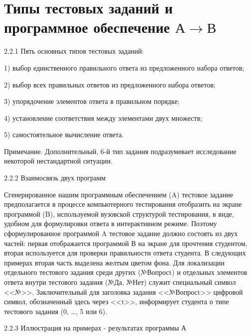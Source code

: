\section{Типы тестовых заданий и программное обеспечение $А \rightarrow В$}\label{AKM_ch2_2}
2.2.1 Пять основных типов тестовых заданий:

1) выбор единственного правильного ответа из предложенного набора ответов;

2) выбор всех правильных ответов из предложенного набора ответов;

3) упорядочение элементов ответа в правильном порядке;

4) установление соответствия между элементами двух множеств;

5) самостоятельное вычисление ответа.

Примечание. Дополнительный, 6-й тип задания подразумевает исследование некоторой нестандартной ситуации.

2.2.2 Взаимосвязь двух программ

Сгенерированное нашим программным обеспечением (\foreignlanguage{english}{A}) тестовое задание предполагается в процессе
компьютерного тестирования отобразить на экране программой (\foreignlanguage{english}{B}), используемой вузовской
структурой тестирования, в виде, удобном для формулировки ответа в интерактивном режиме. Поэтому сформулированное
программой \foreignlanguage{english}{A} тестовое задание должно состоять из двух частей: первая отображается программой
В на экране для прочтения студентом, вторая используется для проверки правильности ответа студента. В следующих
примерах вторая часть выделена желтым цветом фона. Для локализации отдельного тестового задания среди других
(№Вопрос\foreignlanguage{english}{t}) и отдельных элементов ответа внутри тестового задания (№Да, №Нет) служит
специальный символ <<№>>. Заключительный для заголовка задания <<№Вопрос\foreignlanguage{english}{t}>> цифровой символ,
обозначенный здесь через <<\foreignlanguage{english}{t}>>, информирует студента о типе тестового задания (0, …, 5 или 6).


2.2.3 Иллюстрация на примерах - результатах программы А


